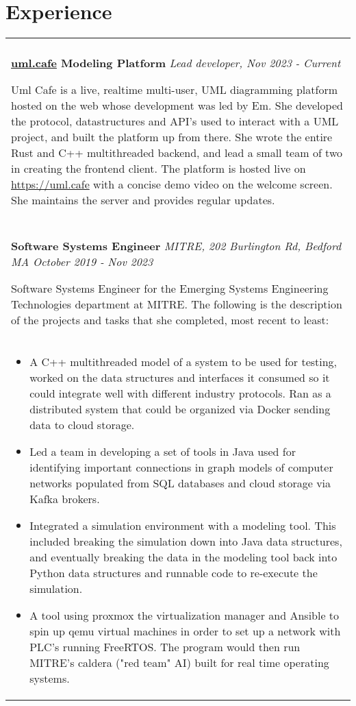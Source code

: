 \documentclass[11pt]{article}
\begin{document}
\section*{Experience}
\begin{tabular}{p{18.5cm}}
    \hline
    \multicolumn{1}{c}{} \\

     \large \textbf{\href{https://uml.cafe}{uml.cafe} Modeling Platform} \normalsize \textit{Lead developer, \hfill Nov 2023 - Current}

     \> Uml Cafe is a live, realtime multi-user, UML diagramming platform hosted on the web whose development was led 
     by Em. She developed the protocol, datastructures and API's used to interact with a UML project, and built the platform up from there. She wrote the
     entire Rust and C++ multithreaded backend, and lead a small team of two in creating the frontend client. The platform is hosted live on 
     \url{https://uml.cafe} with a concise demo video on the welcome screen. She maintains the server and provides regular updates.\\
 
     \multicolumn{1}{c}{} \\

    \large \textbf{Software Systems Engineer} \normalsize \textit{MITRE, 202 Burlington Rd, Bedford MA \hfill October 2019 - Nov 2023}

    \> Software Systems Engineer for the Emerging Systems Engineering Technologies department at MITRE. The following is the 
    description of the projects and tasks that she completed, most recent to least:\\ 

    \begin{itemize}[noitemsep,topsep=0pt]
      \item A C++ multithreaded model of a system to be used for testing, worked on the data structures and interfaces it consumed so it could 
      integrate well with different industry protocols. Ran as a distributed system that could be organized via Docker sending data to cloud storage.
      \item Led a team in developing a set of tools in Java used for identifying important connections in graph models of computer networks populated from SQL 
      databases and cloud storage via Kafka brokers.
      \item Integrated a simulation environment with a modeling tool. This included breaking the simulation down into Java data structures, and eventually breaking the
      data in the modeling tool back into Python data structures and runnable code to re-execute the simulation.
      \item A tool using proxmox the virtualization manager and Ansible to spin up qemu virtual machines in order to set up a network with PLC's running FreeRTOS.
      The program would then run MITRE's caldera ("red team" AI) built for real time operating systems.
    \end{itemize}\\


\end{tabular}
\end{document}
